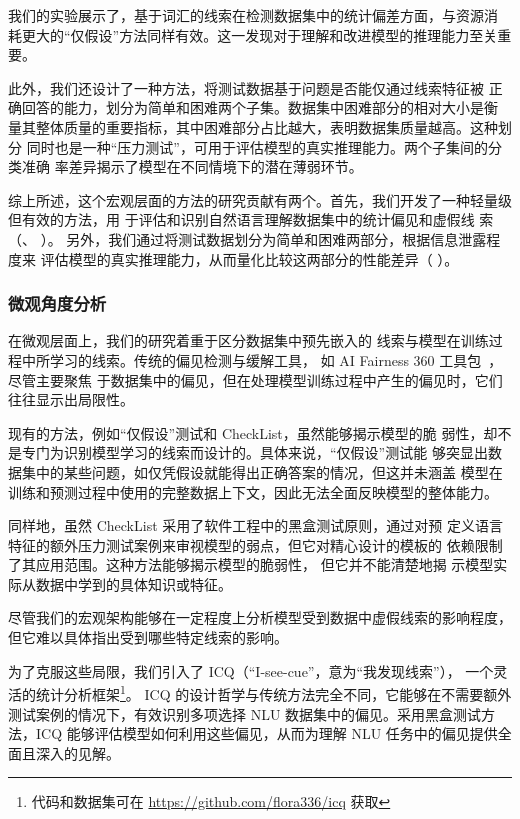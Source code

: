 我们的实验展示了，基于词汇的线索在检测数据集中的统计偏差方面，与资源消
耗更大的``仅假设''方法同样有效。这一发现对于理解和改进模型的推理能力至关重要。

此外，我们还设计了一种方法，将测试数据基于问题是否能仅通过线索特征被
正确回答的能力，划分为简单和困难两个子集。数据集中困难部分的相对大小是衡
量其整体质量的重要指标，其中困难部分占比越大，表明数据集质量越高。这种划分
同时也是一种``压力测试''，可用于评估模型的真实推理能力。两个子集间的分类准确
率差异揭示了模型在不同情境下的潜在薄弱环节。


综上所述，这个宏观层面的方法的研究贡献有两个。首先，我们开发了一种轻量级但有效的方法，用
于评估和识别自然语言理解数据集中的统计偏见和虚假线
索（、 ）。
另外，我们通过将测试数据划分为简单和困难两部分，根据信息泄露程度来
评估模型的真实推理能力，从而量化比较这两部分的性能差异（ ）。

\subsubsection*{微观角度分析}
在微观层面上，我们的研究着重于区分数据集中预先嵌入的
线索与模型在训练过程中所学习的线索。传统的偏见检测与缓解工具，
如 AI Fairness 360 工具包~\cite{bellamy2018ai}，尽管主要聚焦
于数据集中的偏见，但在处理模型训练过程中产生的偏见时，它们往往显示出局限性。

现有的方法，例如``仅假设''测试和 CheckList，虽然能够揭示模型的脆
弱性，却不是专门为识别模型学习的线索而设计的。具体来说，``仅假设''测试能
够突显出数据集中的某些问题，如仅凭假设就能得出正确答案的情况，但这并未涵盖
模型在训练和预测过程中使用的完整数据上下文，因此无法全面反映模型的整体能力。

同样地，虽然 CheckList 采用了软件工程中的黑盒测试原则，通过对预
定义语言特征的额外压力测试案例来审视模型的弱点，但它对精心设计的模板的
依赖限制了其应用范围。这种方法能够揭示模型的脆弱性，
但它并不能清楚地揭
示模型实际从数据中学到的具体知识或特征。

尽管我们的宏观架构能够在一定程度上分析模型受到数据中虚假线索的影响程度，
但它难以具体指出受到哪些特定线索的影响。

为了克服这些局限，我们引入了 ICQ（``I-see-cue''，意为``我发现线索''），
一个灵活的统计分析框架\footnote{代码和数据集可在 \url{https://github.com/flora336/icq} 获取}。
ICQ 的设计哲学与传统方法完全不同，它能够在不需要额外测试案例的情况下，有效识别多项选择
 NLU 数据集中的偏见。采用黑盒测试方法，ICQ 能够评估模型如何利用这些偏见，从而为理解
  NLU 任务中的偏见提供全面且深入的见解。

